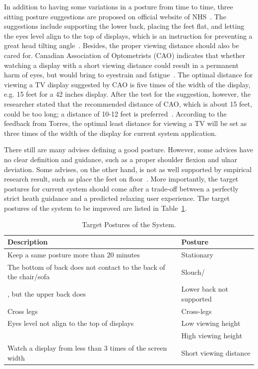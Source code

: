 In addition to having some variations in a posture from time to time, three sitting posture suggestions are proposed on official website of NHS~\cite{nhs_sit_correctly}. The suggestions include supporting the lower back, placing the feet flat, and  letting the eyes level  align to the top of displays, which is an instruction for preventing a great head tilting angle~\cite{nhs_sit_correctly}. Besides, the proper viewing distance should also be cared for. Canadian Association of Optometrists (CAO) indicates that whether watching a display with a short viewing distance could result in a permanent harm of eyes, but would bring to eyestrain and fatigue~\cite{best_viewing_distance_tv}. The optimal distance for viewing a TV display suggested by CAO is five times of the width of the display, e.g. 15 feet for a 42 inches display. After the test for the suggestion, however, the researcher stated that the recommended distance of CAO, which is about 15 feet, could be too long; a distance of 10-12 feet is preferred~\cite{best_viewing_distance_tv}. According to the feedback from Torres, the optimal least distance for viewing a TV will be set as three times of the width of the display for current system application.

There still are many advises defining a good posture. However, some advices have no clear definition and guidance, such as a proper shoulder flexion and ulnar deviation. Some advises, on the other hand, is not as well supported by empirical research result, such as place the feet on floor~\cite{nhs_sit_correctly}. More importantly, the target postures for current system should come after a trade-off between a perfectly strict heath guidance and a predicted relaxing user experience. The target postures of the system to be improved are listed in Table~\ref{tab:posture_descriptions}.

\begin{table}
\centering
\begin{tabular}{|p{10cm}|p{5cm}|}
    \hline
    \textbf{Description} & \textbf{Posture}\\
    
    \hline
    Keep a same posture more than 20 minutes & Stationary\\
    \hline
    The bottom of back does not contact to the back of the chair/sofa & Slouch/\\
    , but the upper back does & Lower back not supported\\
    \hline
    Cross legs & Cross-legs \\
    \hline
    Eyes level not align to the top of displays & Low viewing height\\
     & High viewing height\\
    \hline
    Watch a display from less than 3 times of the screen width & Short viewing distance \\
    
    \hline
\end{tabular}
\caption{Target Postures of the System.}
\label{tab:posture_descriptions}
\end{table}

